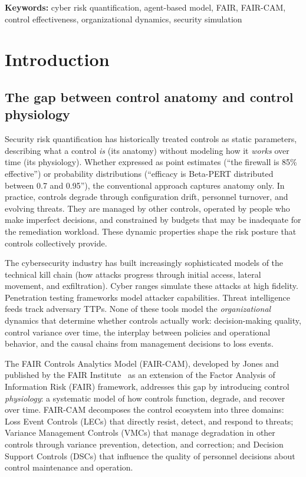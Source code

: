 \documentclass[11pt,a4paper]{article}
\begin{document}
\medskip
\noindent\textbf{Keywords:} cyber risk quantification, agent-based model, FAIR, FAIR-CAM, control effectiveness, organizational dynamics, security simulation

\section{Introduction}

\subsection{The gap between control anatomy and control physiology}

Security risk quantification has historically treated controls as static parameters, describing what a control \emph{is} (its anatomy) without modeling how it \emph{works} over time (its physiology). Whether expressed as point estimates (``the firewall is 85\% effective'') or probability distributions (``efficacy is Beta-PERT distributed between 0.7 and 0.95''), the conventional approach captures anatomy only. In practice, controls degrade through configuration drift, personnel turnover, and evolving threats. They are managed by other controls, operated by people who make imperfect decisions, and constrained by budgets that may be inadequate for the remediation workload. These dynamic properties shape the risk posture that controls collectively provide.

The cybersecurity industry has built increasingly sophisticated models of the technical kill chain (how attacks progress through initial access, lateral movement, and exfiltration). Cyber ranges simulate these attacks at high fidelity. Penetration testing frameworks model attacker capabilities. Threat intelligence feeds track adversary TTPs. None of these tools model the \emph{organizational} dynamics that determine whether controls actually work: decision-making quality, control variance over time, the interplay between policies and operational behavior, and the causal chains from management decisions to loss events.

The FAIR Controls Analytics Model (FAIR-CAM), developed by Jones and published by the FAIR Institute~\citep{Jones2023FAIRCAM} as an extension of the Factor Analysis of Information Risk (FAIR) framework, addresses this gap by introducing control \emph{physiology}: a systematic model of how controls function, degrade, and recover over time. FAIR-CAM decomposes the control ecosystem into three domains: Loss Event Controls (LECs) that directly resist, detect, and respond to threats; Variance Management Controls (VMCs) that manage degradation in other controls through variance prevention, detection, and correction; and Decision Support Controls (DSCs) that influence the quality of personnel decisions about control maintenance and operation.
\end{document}
